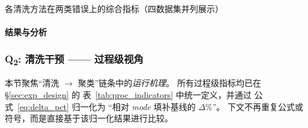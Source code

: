 \documentclass[10pt]{article} %
\numberwithin{equation}{section}
\begin{document}
\begin{table}[htbp]
\caption{各清洗方法在两类错误上的综合指标（四数据集并列展示）}
\label{tab:q1-acc-all}
\end{table}

\vspace{-1em}

\paragraph{结果与分析}

\subsubsection{Q\textsubscript{2}: 清洗干预 —— 过程级视角}
\label{subsec:internal_tracking}

本节聚焦“清洗 $\rightarrow$ 聚类”链条中的\emph{运行机理}。
所有过程级指标均已在 §\ref{sec:exp_design} 的
表~\ref{tab:proc_indicators} 中统一定义，并通过
公式~\eqref{eq:delta_pct} 归一化为
“相对 \textit{mode} 填补基线的 $\Delta\%$”。
下文不再重复公式或符号，而是直接基于该归一化结果进行比较。
\end{document}
